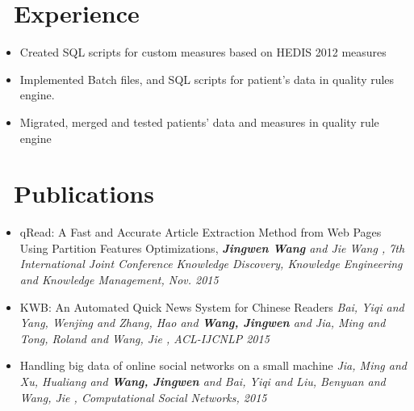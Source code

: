 \documentclass{resume}
\begin{document}


\section{\faUsers\ Experience}
\begin{itemize}
  \item Created SQL scripts for custom measures based on HEDIS 2012 measures
  \item Implemented Batch files, and SQL scripts for patient’s data in quality rules engine.
  \item Migrated, merged and tested patients’ data and measures in quality rule engine
\end{itemize}




\section{\faBook \ Publications}

\begin{itemize}
  \item qRead: A Fast and Accurate Article Extraction Method from Web Pages Using Partition Features Optimizations,
  \textit{\textbf{Jingwen Wang} and Jie Wang
  , 7th International Joint Conference Knowledge Discovery, Knowledge Engineering and Knowledge Management, Nov. 2015}
  \item KWB: An Automated Quick News System for Chinese Readers
  \textit{Bai, Yiqi and Yang, Wenjing and Zhang, Hao and \textbf{Wang, Jingwen} and Jia, Ming and Tong, Roland and Wang, Jie
  , ACL-IJCNLP 2015}
  \item Handling big data of online social networks on a small machine
  \textit{Jia, Ming and Xu, Hualiang and \textbf{Wang, Jingwen} and Bai, Yiqi and Liu, Benyuan and Wang, Jie
  , Computational Social Networks, 2015}
\end{itemize}
\end{document}
